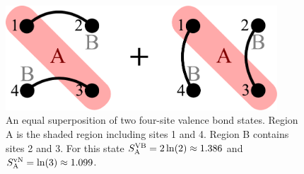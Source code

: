 

\begin{figure}
\centering
\includegraphics[width=4in]{./figures/made/example1.pdf}
\caption[A superposition of two four-site valence bond states]{An equal superposition of two four-site valence bond states.  
Region A is the shaded region including sites 1 and 4.
Region B contains sites 2 and 3.
For this state $S^{\text{VB}}_{\rm A}=2\ln(2)\approx1.386$ and $S^{\text{vN}}_{\rm A}=\ln(3)\approx 1.099$.
 \label{example1}
}
\end{figure}


